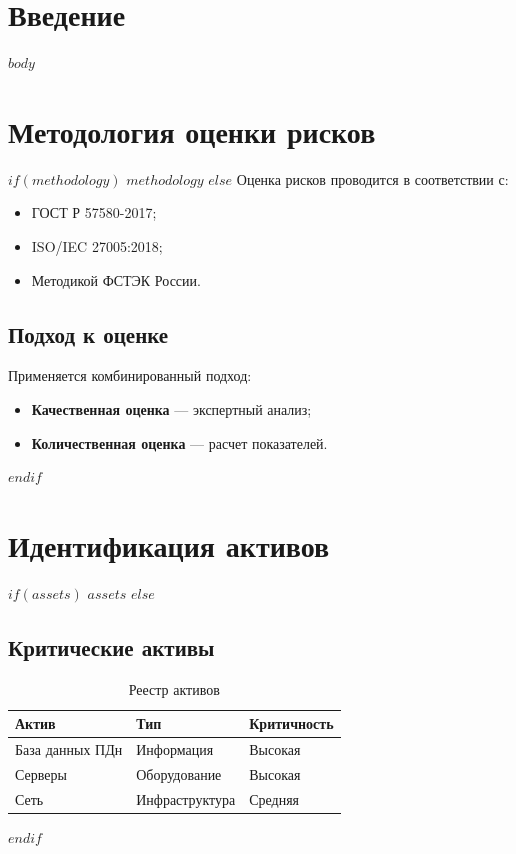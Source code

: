 \documentclass[14pt,a4paper]{extarticle}
\begin{document}
\makeTitlePage

\mainpagestyle
\tableofcontents
\newpage

\section{Введение}
\label{sec:intro}

$body$

\section{Методология оценки рисков}
\label{sec:methodology}

$if(methodology)$
$methodology$
$else$
Оценка рисков проводится в соответствии с:
\begin{itemize}
    \item ГОСТ Р 57580-2017;
    \item ISO/IEC 27005:2018;
    \item Методикой ФСТЭК России.
\end{itemize}

\subsection{Подход к оценке}
Применяется комбинированный подход:
\begin{itemize}
    \item \textbf{Качественная оценка} — экспертный анализ;
    \item \textbf{Количественная оценка} — расчет показателей.
\end{itemize}
$endif$

\section{Идентификация активов}
\label{sec:assets}

$if(assets)$
$assets$
$else$
\subsection{Критические активы}
\begin{table}[h]
\centering
\caption{Реестр активов}
\begin{tabular}{|l|l|l|}
\hline
\textbf{Актив} & \textbf{Тип} & \textbf{Критичность} \\
\hline
База данных ПДн & Информация & Высокая \\
Серверы & Оборудование & Высокая \\
Сеть & Инфраструктура & Средняя \\
\hline
\end{tabular}
\end{table}
$endif$
\end{document}
